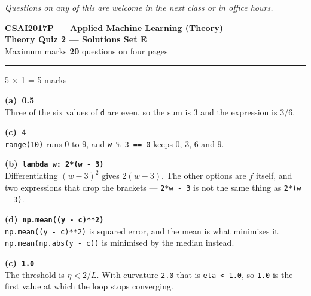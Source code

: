 \documentclass[10pt,a4paper]{article}
\newcommand{\SetLetter}{}
\newcommand{\parthead}[2]{\vspace{2pt}\noindent\rule{\linewidth}{0.4pt}\par\vspace{2pt}%
  \noindent{\bfseries Part #1}\hfill{\small #2}\par\vspace{1pt}}
\newcommand{\sol}[1]{\textbf{#1}}
\begin{document}
{\footnotesize\itshape Questions on any of this are welcome in the next class or in office hours.}

\newpage


\renewcommand{\SetLetter}{E}\setcounter{page}{1}

\begin{center}
{\large\bfseries CSAI2017P --- Applied Machine Learning (Theory)}\\[2pt]
{\large\bfseries Theory Quiz 2 --- Solutions \quad\textbullet\quad Set E}\\[3pt]
{\small Maximum marks \textbf{20} \quad\textbullet{} questions on four pages}
\end{center}
\vspace{2pt}

\noindent{}
\vspace{3pt}


\parthead{A --- Multiple choice}{5 $\times$ 1 = 5 marks}

\begin{sA}

  \item \sol{(a)\ 0.5}\\ Three of the six values of \texttt{d} are even, so the sum is $3$ and the expression is $3/6$.

  \item \sol{(c)\ 4}\\ \texttt{range(10)} runs $0$ to $9$, and \texttt{w \% 3 == 0} keeps $0$, $3$, $6$ and $9$.

  \item \sol{(b)\ \texttt{lambda w: 2*(w - 3)}}\\ Differentiating $(w-3)^2$ gives $2(w-3)$. The other options are $f$ itself, and two expressions that drop the brackets --- \texttt{2*w - 3} is not the same thing as \texttt{2*(w - 3)}.

  \item \sol{(d)\ \texttt{np.mean((y - c)**2)}}\\ \texttt{np.mean((y - c)**2)} is squared error, and the mean is what minimises it. \texttt{np.mean(np.abs(y - c))} is minimised by the median instead.

  \item \sol{(c)\ \texttt{1.0}}\\ The threshold is $\eta < 2/L$. With curvature \texttt{2.0} that is \texttt{eta < 1.0}, so \texttt{1.0} is the first value at which the loop stops converging.

\end{sA}
\end{document}
